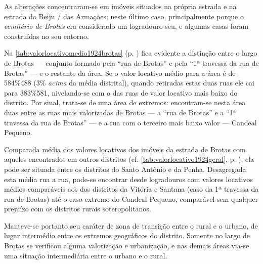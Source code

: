 



As alterações concentraram-se em imóveis situados na própria estrada e na estrada do Beiju / das Armações; neste último caso, principalmente porque o \textit{cemitério de Brotas} era considerado um logradouro seu, e algumas casas foram construídas no seu entorno.


Na \autoref{tab:valorlocativomedio1924brotas} (p. \pageref{tab:valorlocativomedio1924brotas}) fica evidente a distinção entre o largo de Brotas --- conjunto formado pela ``rua de Brotas'' e pela ``1ª travessa da rua de Brotas'' --- e o restante da área. Se o valor locativo médio para a área é de 584\%488 (3\% \textit{acima} da média distrital), quando retiradas estas duas ruas ele cai para 383\%581, nivelando-se com o das ruas de valor locativo mais baixo do distrito. Por sinal, trata-se de uma área de extremos: encontram-se nesta área duas entre as ruas mais valorizadas de Brotas  --- a ``rua de Brotas'' e a ``1ª travessa da rua de Brotas'' --- e a rua com o terceiro mais baixo valor --- Candeal Pequeno.

Comparada média dos valores locativos dos imóveis da estrada de Brotas com aqueles encontrados em outros distritos (cf. \autoref{tab:valorlocativo1924geral}, p. \pageref{tab:valorlocativo1924geral}), ela pode ser situada entre os distritos do Santo Antônio e da Penha. Desagregada esta média rua a rua, pode-se encontrar desde logradouros com valores locativos médios comparáveis aos dos distritos da Vitória e Santana (caso da 1ª travessa da rua de Brotas) até o caso extremo do Candeal Pequeno, comparável sem qualquer prejuízo com os distritos rurais soteropolitanos.


Manteve-se portanto seu caráter de zona de transição entre o rural e o urbano, de lugar intermédio entre os extremos geográficos do distrito. Somente no largo de Brotas se verificou alguma valorização e urbanização, e nas demais áreas via-se uma situação intermediária entre o urbano e o rural.


